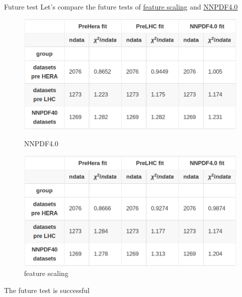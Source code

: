 \documentclass[aspectratio=169,11pt]{beamer}
\begin{document}
\begin{frame}[t]{Future test}
  Let's compare the future tests of {\color{blue} \underline{\href{https://vp.nnpdf.science/TVyAUeiNTk26IMYAfRNqLw==}{feature scaling}}} and {\color{blue} \underline{\href{https://vp.nnpdf.science/ArCroD6xRxmTAGHSBJoD3Q==/}{NNPDF4.0}}}
  \begin{center}
    \begin{figure}
        \includegraphics[width=1\textwidth]{figures/futuretest_nnpdf40.png}
        \captionsetup{labelformat=empty}
        \caption{NNPDF4.0}
      \endminipage\hfill
        \includegraphics[width=1\textwidth]{figures/futuretest_feature.png}
        \captionsetup{labelformat=empty}
        \caption{feature scaling}
      \endminipage
    \end{figure}
    \vspace*{1em}
     {The future test is successful}
  \end{center}
\end{frame}
\end{document}

